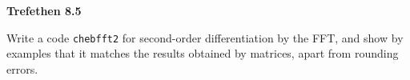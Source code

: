 \textbf{Trefethen 8.5}

Write a code \texttt{chebfft2} for second-order differentiation by the FFT, and show by examples that it matches the
results obtained by matrices, apart from rounding errors.

\begin{solution}
  \ \\
  \vfill
\end{solution}